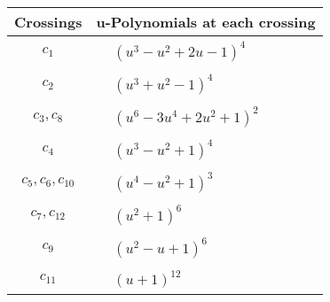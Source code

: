 \documentclass[1p]{elsarticle_modified}
\theoremstyle{definition}
\begin{document}
\begin{tabular}{m{50pt}|m{274pt}}
Crossings & \hspace{64pt}u-Polynomials at each crossing \\
\hline $$\begin{aligned}c_{1}\end{aligned}$$&$\begin{aligned}
&(u^3- u^2+2 u-1)^4
\end{aligned}$\\
\hline $$\begin{aligned}c_{2}\end{aligned}$$&$\begin{aligned}
&(u^3+u^2-1)^4
\end{aligned}$\\
\hline $$\begin{aligned}c_{3},c_{8}\end{aligned}$$&$\begin{aligned}
&(u^6-3 u^4+2 u^2+1)^2
\end{aligned}$\\
\hline $$\begin{aligned}c_{4}\end{aligned}$$&$\begin{aligned}
&(u^3- u^2+1)^4
\end{aligned}$\\
\hline $$\begin{aligned}c_{5},c_{6},c_{10}\end{aligned}$$&$\begin{aligned}
&(u^4- u^2+1)^3
\end{aligned}$\\
\hline $$\begin{aligned}c_{7},c_{12}\end{aligned}$$&$\begin{aligned}
&(u^2+1)^6
\end{aligned}$\\
\hline $$\begin{aligned}c_{9}\end{aligned}$$&$\begin{aligned}
&(u^2- u+1)^6
\end{aligned}$\\
\hline $$\begin{aligned}c_{11}\end{aligned}$$&$\begin{aligned}
&(u+1)^{12}
\end{aligned}$\\
\hline
\end{tabular}\\~\\
\end{document}
